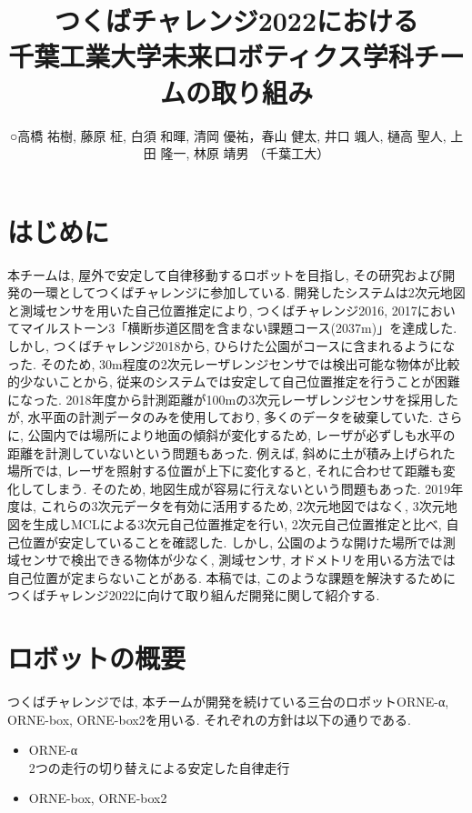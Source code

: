 \documentclass[uplatex, twocolumn, 9pt]{jsproceedings}
\title{つくばチャレンジ2022における\\千葉工業大学未来ロボティクス学科チームの取り組み}
\author{○高橋 祐樹, 藤原 柾, 白須 和暉, 清岡 優祐，春山 健太, 井口 颯人, 樋高 聖人, \newline 上田 隆一, 林原 靖男 （千葉工大）}
\affiliation{千葉工業大学未来ロボティクス学科チームα, box, box2}
\begin{document}
\maketitle


\section{はじめに}
本チームは, 屋外で安定して自律移動するロボットを目指し, その研究および開発の一環としてつくばチャレンジに参加している. 開発したシステムは2次元地図と測域センサを用いた自己位置推定により, つくばチャレンジ2016, 2017においてマイルストーン3「横断歩道区間を含まない課題コース(2037m)」を達成した. しかし, つくばチャレンジ2018から, ひらけた公園がコースに含まれるようになった. そのため, 30m程度の2次元レーザレンジセンサでは検出可能な物体が比較的少ないことから, 従来のシステムでは安定して自己位置推定を行うことが困難になった. 2018年度から計測距離が100mの3次元レーザレンジセンサを採用したが, 水平面の計測データのみを使用しており, 多くのデータを破棄していた. さらに, 公園内では場所により地面の傾斜が変化するため, レーザが必ずしも水平の距離を計測していないという問題もあった. 例えば, 斜めに土が積み上げられた場所では, レーザを照射する位置が上下に変化すると, それに合わせて距離も変化してしまう. そのため, 地図生成が容易に行えないという問題もあった. 2019年度は, これらの3次元データを有効に活用するため, 2次元地図ではなく, 3次元地図を生成しMCLによる3次元自己位置推定を行い, 2次元自己位置推定と比べ, 自己位置が安定していることを確認した. しかし, 公園のような開けた場所では測域センサで検出できる物体が少なく, 測域センサ, オドメトリを用いる方法では自己位置が定まらないことがある. 本稿では, このような課題を解決するためにつくばチャレンジ2022に向けて取り組んだ開発に関して紹介する. 

\section{ロボットの概要}
つくばチャレンジでは, 本チームが開発を続けている三台のロボットORNE-α, ORNE-box, ORNE-box2を用いる. それぞれの方針は以下の通りである. 
\begin{itemize}
  \item ORNE-α\\2つの走行の切り替えによる安定した自律走行
  \item ORNE-box, ORNE-box2\\ 
\end{itemize}
\end{document}
